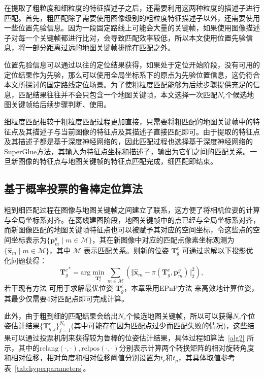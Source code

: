 在提取了粗粒度和细粒度的特征描述子之后，还需要利用这两种粒度的描述子进行匹配。首先，粗匹配除了需要使用图像级别的粗粒度特征描述子以外，还需要使用一些位置先验信息。因为一段固定路线上可能会大量的关键帧，如果使用图像描述子对每一个关键帧都进行比对，会导致匹配效率较低，所以本文使用位置先验信息，将一部分距离过远的地图关键帧排除在匹配之外。

位置先验信息可以通过以往的定位结果获得，如果处于定位开始阶段，没有可用的定位结果作为先验，那么可以使用全局坐标系下的原点为先验位置信息，这仍符合本文所探讨的国定路线定位场景。为了使粗粒度匹配能够为后续步骤提供充足的信息，匹配结果往往并不会只包含一个地图关键帧，本文选择一次匹配$N_c$个候选地图关键帧给后续步骤判断、使用。

细粒度匹配相较于粗粒度匹配过程更加直接，只需要将粗匹配的地图关键帧中的特征点及其描述子与当前图像的特征点及其描述子直接匹配即可。由于提取的特征点及其描述子都是基于深度神经网络的，因此匹配过程也选择基于深度神经网络的SuperGlue\cite{sarlin2020superglue}方法，其输入为特征点坐标和描述子，输出为它们之间的匹配关系。一旦新图像的特征点与地图关键帧的特征点匹配完成，细匹配即结束。

\subsection{基于概率投票的鲁棒定位算法}
\label{sec:loc_vote}

粗到细匹配过程在图像与地图关键帧之间建立了联系，这方便了将相机位姿的计算与全局坐标系对齐。在离线建图阶段，地图关键帧中的点已经与全局坐标系对齐，而新图像匹配的地图关键帧特征点也可以被赋予其对应的空间坐标，令这些点的空间坐标表示为$\{\symbf{p}_m^g \mid m \in \mathcal{M}\}$，其在新图像中对应的匹配点像素坐标观测为$\{\hat{\symbf{x}}_m \mid m \in \mathcal{M}\}$，其中 $\mathcal{M}$ 表示匹配关系。则新的位姿 $\symbf{T}^{c}_g$ 可通过求解以下投影优化问题获得：
\begin{equation}
  {\symbf{T}^{c}_g}^* = \text{arg} \min_{\symbf{T}_{c}^g} \sum_{m \in \mathcal{M}} \left( \Vert \hat{\symbf{x}}_m - \pi(\symbf{T}^{c}_g, \symbf{p}_m^g) \Vert^2_2 \right),
\end{equation}
若干现有方法 \cite{lepetit2009ep, gao2003complete} 可用于求解最优位姿 $\symbf{T}^{c}_g$，本章采用EPnP方法 \cite{lepetit2009ep}来高效地计算位姿，其最少仅需要4对匹配点即可完成计算。

此外，由于粗到细的匹配结果会给出$N_c$个候选地图关键帧，所以可以获得$N_c$个位姿估计结果$\{ \symbf{T}^{c}_{g,j} \}^{N_c}_{j=1}$(其中可能存在因为匹配点过少而匹配失败的情况)，这些结果可以通过投票机制来获得较为鲁棒的位姿估计结果，具体过程如算法~\ref{alg2} 所示，其中的$\text{relang}(\cdot, \cdot),\text{relpos}(\cdot, \cdot)$分别表示计算两个转换矩阵的相对旋转角度和相对位移，相对角度和相对位移阈值分别设置为$t_r$和$t_p$，其具体取值参考表~\ref{tab:hyperparameters}。

